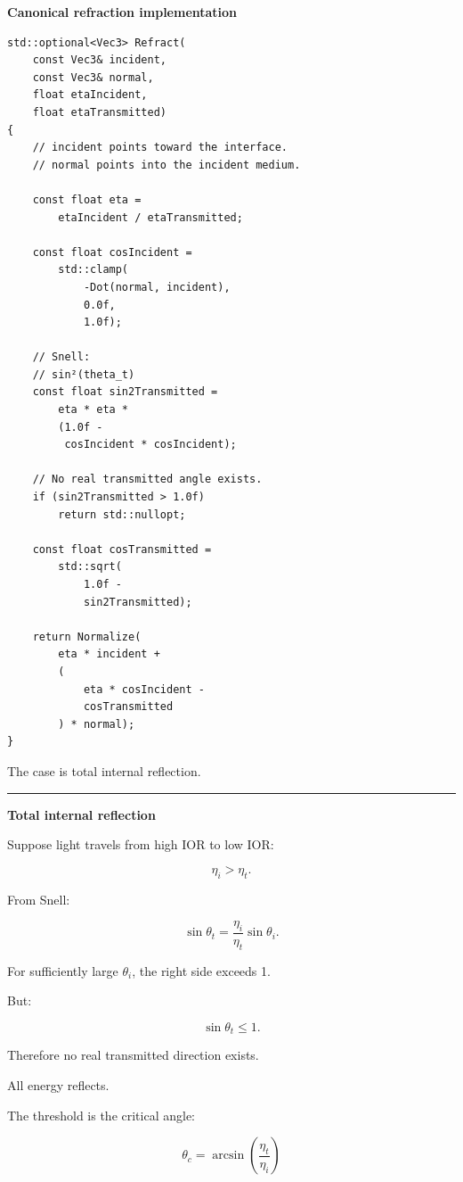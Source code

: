\textbf{Canonical refraction implementation}

\begin{verbatim}
std::optional<Vec3> Refract(
    const Vec3& incident,
    const Vec3& normal,
    float etaIncident,
    float etaTransmitted)
{
    // incident points toward the interface.
    // normal points into the incident medium.

    const float eta =
        etaIncident / etaTransmitted;

    const float cosIncident =
        std::clamp(
            -Dot(normal, incident),
            0.0f,
            1.0f);

    // Snell:
    // sin²(theta_t)
    const float sin2Transmitted =
        eta * eta *
        (1.0f -
         cosIncident * cosIncident);

    // No real transmitted angle exists.
    if (sin2Transmitted > 1.0f)
        return std::nullopt;

    const float cosTransmitted =
        std::sqrt(
            1.0f -
            sin2Transmitted);

    return Normalize(
        eta * incident +
        (
            eta * cosIncident -
            cosTransmitted
        ) * normal);
}
\end{verbatim}

The  case is total internal reflection.

\begin{center}\rule{0.5\linewidth}{0.5pt}\end{center}

\textbf{Total internal reflection}

Suppose light travels from high IOR to low IOR:

\[
\eta_i>\eta_t.
\]

From Snell:

\[
\sin\theta_t
=
\frac{\eta_i}{\eta_t}
\sin\theta_i.
\]

For sufficiently large \(\theta_i\), the right side exceeds 1.

But:

\[
\sin\theta_t\le1.
\]

Therefore no real transmitted direction exists.

All energy reflects.

The threshold is the critical angle:

\[
\boxed{
\theta_c=
\arcsin
\left(
\frac{\eta_t}{\eta_i}
\right)
}
\]

